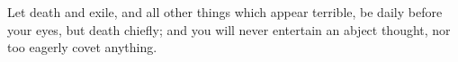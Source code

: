 Let death and exile, and all other things which appear terrible, be daily
before your eyes, but death chiefly; and you will never entertain an
abject thought, nor too eagerly covet anything.
